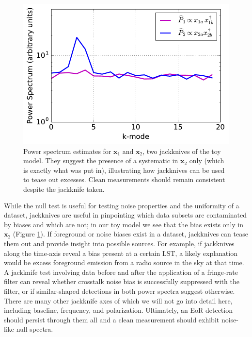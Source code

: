 \documentclass[preprint2,numberedappendix,tighten]{aastex6}
\begin{document}
\begin{figure}
	\centering
	\includegraphics[trim={0cm 0cm 0cm 0cm},width=\columnwidth]{plots/toy_bias2.pdf}
	\caption{Power spectrum estimates for $\textbf{x}_{1}$ and $\textbf{x}_{2}$, two jackknives of the toy model. They suggest 
the presence of a systematic in $\textbf{x}_{2}$ only (which is exactly what was put in), illustrating how jackknives can be used to tease out excesses. Clean 
measurements should remain consistent despite the jackknife taken.}
	\label{fig:toy_bias2}
\end{figure}

While the null test is useful for testing noise properties and the uniformity of a dataset, jackknives are useful in pinpointing 
which data subsets are contaminated by biases and which are not; in our toy model we see that the bias exists only in $
\textbf{x}_{2}$ (Figure \ref{fig:toy_bias2}). If foreground or noise biases exist in a dataset, jackknives can tease them out and 
provide insight into possible sources. For example, if jackknives along the time-axis reveal a bias present at a certain LST, a 
likely explanation would be excess foreground emission from a radio source in the sky at that time. A jackknife test involving 
data before and after the application of a fringe-rate filter can reveal whether crosstalk noise bias is successfully suppressed 
with the filter, or if similar-shaped detections in both power spectra suggest otherwise. There are many other jackknife axes of 
which we will not go into detail here, including baseline, frequency, and polarization. Ultimately, an EoR detection should persist 
through them all and a clean measurement should exhibit noise-like null spectra.
\end{document}
